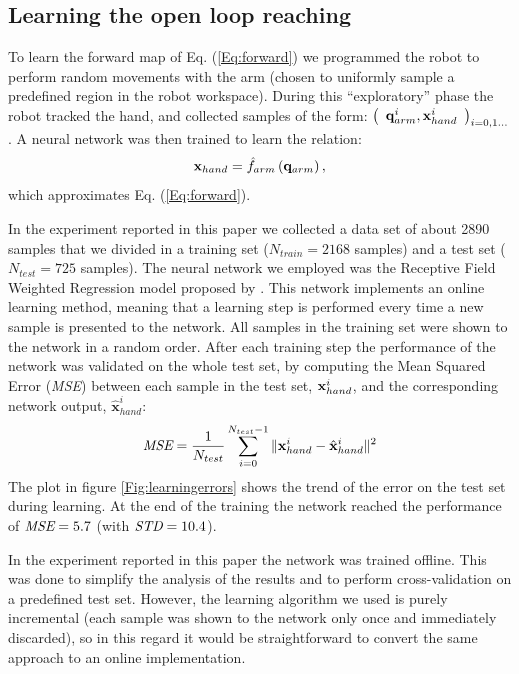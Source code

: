 \subsection{Learning the open loop reaching}
\label{sec:learning-open-loop}
%
To learn the forward map of Eq. (\ref{Eq:forward}) we programmed 
the robot to perform random movements with the arm (chosen to uniformly sample 
a predefined region in the robot workspace). During this ``exploratory'' 
phase the robot tracked the hand, and collected samples of the form: $
%
\left(\begin{array}{cc}
  \qarm^i , \xhand^i\end{array}\right)_{i = 0,1\dots}$.
%
 A neural network was then trained to learn the relation:
%
\begin{equation} 
  \mathbf{x}_{hand}=\hat{f}_{arm}\left(\mathbf q_{arm} \right),
\end{equation}
%
which approximates Eq. (\ref{Eq:forward}).

In the experiment reported in this paper we collected a data set of 
about 2890 samples that we divided in a training set ($N_{train}=2168$
 samples) and 
a test set ($N_{test}=725$ samples). The neural network we employed was the 
Receptive Field Weighted Regression model proposed 
by \cite{schaal98Constructive}. This network implements an online learning
method, meaning that a learning step is performed every time a new 
sample is presented to the network. All samples in the training set were shown
to the network in a random order. After each training step the 
performance of the network was validated on the whole test set, by computing
the Mean Squared Error (\emph{MSE}) between each sample in the test set, 
$\mathbf{x}_{hand}^i$, and the corresponding network output, 
$\mathbf{\hat{x}}_{hand}^i$:
%
\begin{equation}
\emph{MSE}=\frac{1}{N_{test}}\sum_{i=0}^{N_{test}-1}\|\mathbf{x}_{hand}^i- \hat{\mathbf{x}}_{hand}^i\|^2
\end{equation}
%
The plot in figure \ref{Fig:learningerrors}
shows the trend of the error on the test set during learning. At the end of
the training the network reached the performance of $\emph{MSE}=5.7$ 
(with $\emph{STD}=10.4$).

In the experiment reported in this paper the network was trained offline. 
This was done to simplify the analysis of the results and to perform cross-validation 
on a predefined test set. However, the learning algorithm we used is purely 
incremental (each sample was shown to the network only once and immediately 
discarded), so in this regard it would be straightforward to convert the 
same approach to an online implementation.

